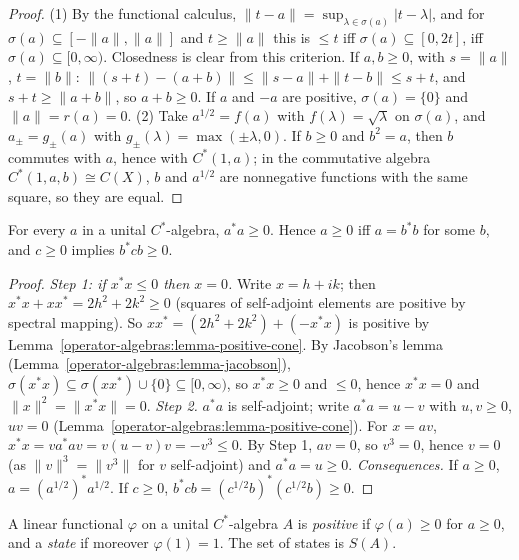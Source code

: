 \begin{proof}
(1) By the functional calculus, $\|t - a\| = \sup_{\lambda \in \sigma(a)}|t - \lambda|$, and for $\sigma(a) \subseteq [-\|a\|, \|a\|]$ and $t \geq \|a\|$ this is $\leq t$ iff $\sigma(a) \subseteq [0, 2t]$, iff $\sigma(a) \subseteq [0, \infty)$.
Closedness is clear from this criterion. If $a, b \geq 0$, with $s = \|a\|$, $t = \|b\|$: $\|(s + t) - (a + b)\| \leq \|s - a\| + \|t - b\| \leq s + t$, and $s + t \geq \|a + b\|$, so $a + b \geq 0$. If $a$ and $-a$ are
positive, $\sigma(a) = \{0\}$ and $\|a\| = r(a) = 0$. (2) Take $a^{1/2} = f(a)$ with $f(\lambda) = \sqrt\lambda$ on $\sigma(a)$, and $a_\pm = g_\pm(a)$ with $g_\pm(\lambda) = \max(\pm\lambda, 0)$. If $b \geq 0$ and $b^2 = a$, then $b$
commutes with $a$, hence with $C^*(1, a)$; in the commutative algebra $C^*(1, a, b) \cong C(X)$, $b$ and $a^{1/2}$ are nonnegative functions with the same square, so they are equal.
\end{proof}

\begin{theorem}\label{operator-algebras:theorem-astara-positive}
For every $a$ in a unital $C^*$-algebra, $a^*a \geq 0$. Hence $a \geq 0$ iff $a = b^*b$ for some $b$, and $c \geq 0$ implies $b^*cb \geq 0$.
\end{theorem}

\begin{proof}
\emph{Step 1: if $x^*x \leq 0$ then $x = 0$.} Write $x = h + ik$; then $x^*x + xx^* = 2h^2 + 2k^2 \geq 0$ (squares of self-adjoint elements are positive by spectral mapping). So $xx^* = (2h^2 + 2k^2) + (-x^*x)$ is positive by
Lemma~\ref{operator-algebras:lemma-positive-cone}. By Jacobson's lemma (Lemma~\ref{operator-algebras:lemma-jacobson}), $\sigma(x^*x) \subseteq \sigma(xx^*) \cup \{0\} \subseteq [0, \infty)$, so $x^*x \geq 0$ and $\leq 0$, hence $x^*x = 0$
and $\|x\|^2 = \|x^*x\| = 0$.
\emph{Step 2.} $a^*a$ is self-adjoint; write $a^*a = u - v$ with $u, v \geq 0$, $uv = 0$ (Lemma~\ref{operator-algebras:lemma-positive-cone}). For $x = av$, $x^*x = va^*av = v(u - v)v = -v^3 \leq 0$. By Step 1, $av = 0$,
so $v^3 = 0$, hence $v = 0$ (as $\|v\|^3 = \|v^3\|$ for $v$ self-adjoint) and $a^*a = u \geq 0$.
\emph{Consequences.} If $a \geq 0$, $a = (a^{1/2})^*a^{1/2}$. If $c \geq 0$, $b^*cb = (c^{1/2}b)^*(c^{1/2}b) \geq 0$.
\end{proof}

\begin{definition}\label{operator-algebras:definition-state}
A linear functional $\varphi$ on a unital $C^*$-algebra $A$ is \emph{positive} if $\varphi(a) \geq 0$ for $a \geq 0$, and a \emph{state} if moreover $\varphi(1) = 1$. The set of states is $S(A)$.
\end{definition}

